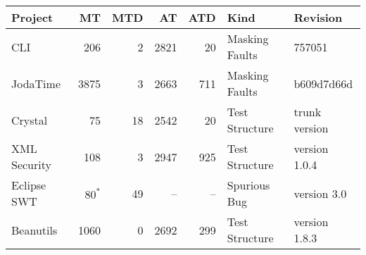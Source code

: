 \newcommand{\masking}{Masking Faults}
\newcommand{\initializaiton}{Test Structure} %
\newcommand{\spurious}{Spurious Bug}

\begin{figure*}
\centering
\setlength{\tabcolsep}{2\tabcolsep}
\begin{tabular}{lrrrrll}
\toprule
\textbf{Project} & \textbf{MT} & \textbf{MTD} &
\textbf{AT} & \textbf{ATD} &
\textbf{Kind} &
\textbf{Revision}
\\
\midrule
CLI & 206 
& 2 & 2821& 20 & \masking{} & 757051\\
JodaTime & 3875 
& 3 & 2663 & 711  & \masking{} & b609d7d66d\\
Crystal & 75 & 18 & 2542 & 20 &\initializaiton{} & trunk version\\
XML Security & 108 & 3 & 2947 & 925 & \initializaiton{} & version 1.0.4 \\ %
Eclipse SWT & $80^*$ 
& 49 & -- & -- 
& \spurious{} &
version 3.0 \\
Beanutils & 1060 & 0 & 2692 & 299 & \initializaiton{} & version 1.8.3 \\
\bottomrule
\end{tabular}
\caption{Summary of all examples. Columns ``MT'' and ``AT'' are the
numbers of human-written and automatically generated tests,
respectively. Columns ``MTD'' and ``ATD''
are the numbers of test dependences
in the corresponding test suites. Column ``Kind'' refers to the kind
of problem associated with the dependency. ${}^*$ We only examined 80
tests in SWT manually, and found 49 dependencies among them.%
}
\label{fig:example-summary}
\end{figure*}
